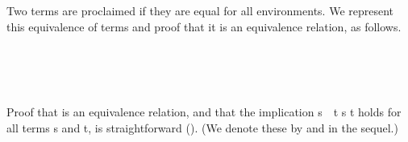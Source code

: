 Two terms are proclaimed  if they are equal for all
environments.  We represent this equivalence of terms
\ifshort\else
and proof that it is an equivalence relation,
\fi
as follows.

\begin{code}%
\>[0]\<%
\\
\>[0][@{}l@{\AgdaIndent{1}}]%
\>[1]\AgdaSpace{}%
\AgdaSymbol{:}\AgdaSpace{}%
\AgdaSymbol{\{}\AgdaSpace{}%
\AgdaSymbol{:}\AgdaSpace{}%
\AgdaSpace{}%
\AgdaSymbol{\}(}\AgdaSpace{}%
\AgdaSpace{}%
\AgdaSymbol{:}\AgdaSpace{}%
\AgdaSpace{}%
\AgdaSymbol{)}\AgdaSpace{}%
\AgdaSpace{}%
\AgdaSpace{}%
\AgdaSymbol{\AgdaUnderscore{}}\<%
\\
%
\>[1]\AgdaSpace{}%
\AgdaSymbol{\{}\AgdaSpace{}%
\AgdaSymbol{=}\AgdaSpace{}%
\AgdaSymbol{\}}\AgdaSpace{}%
\AgdaSpace{}%
\AgdaSpace{}%
\AgdaSymbol{=}\AgdaSpace{}%
\AgdaSpace{}%
\AgdaSymbol{(}\AgdaSpace{}%
\AgdaSymbol{:}\AgdaSpace{}%
\AgdaSpace{}%
\AgdaSymbol{(}\AgdaSpace{}%
\AgdaSymbol{))}\AgdaSpace{}%
\AgdaSpace{}%
\AgdaSpace{}%
\AgdaSpace{}%
\AgdaSpace{}%
\AgdaSpace{}%
\AgdaSpace{}%
\AgdaSpace{}%
\AgdaSpace{}%
\AgdaSpace{}%
\AgdaSpace{}%
\AgdaSpace{}%
\<%
\\
\>[0]\<%
\end{code}
\ifshort
Proof that  is an equivalence relation, and that the implication \ab
s~~\ab t   \ab s \ab t holds for all terms \ab s and \ab t, is
straightforward (\seemedium).
(We denote these by  and  in the sequel.)
\else

